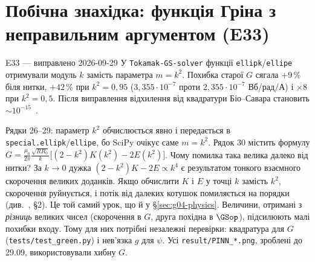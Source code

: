 \section{Побічна знахідка: функція Гріна з неправильним аргументом (E33)}\label{sec:g04-e33}

\begin{established}{E33 --- виправлено 2026-09-29}
У \texttt{Tokamak-GS-solver} функції \texttt{ellipk}/\texttt{ellipe} отримували модуль $k$ замість параметра $m=k^2$. Похибка старої $G$ сягала $+9\,\%$ біля нитки, $+42\,\%$ при $k^2=0{,}95$ ($3{,}355\cdot10^{-7}$ проти $2{,}355\cdot10^{-7}$ Вб/рад/А) і $\times8$ при $k^2=0{,}5$. Після виправлення відхилення від квадратури Біо--Савара становить $\sim10^{-15}$~\cite{RegEst,g04GSsolverChanges}.
\end{established}


Рядки 26--29: параметр $k^2$ обчислюється явно і передається в \texttt{special.ellipk}/\texttt{ellipe}, бо SciPy очікує саме $m=k^2$. Рядок 30 містить формулу $G=\frac{\mu_0}{2\pi}\frac{\sqrt{RR_0}}{k}\big[(2-k^2)K(k^2)-2E(k^2)\big]$. Чому помилка така велика далеко від нитки? За $k\to0$ дужка $(2-k^2)K-2E\propto k^4$ є результатом тонкого взаємного скорочення великих доданків. Якщо обчислити $K$ і $E$ у точці $k$ замість $k^2$, скорочення руйнується, і потік від далеких котушок помиляється на порядки (див.~\cite{g04GSsolverChanges}, §2). Це той самий урок, що й у \S\ref{sec:g04-physics}. Величини, отримані з \emph{різниць} великих чисел (скорочення в $G$, друга похідна в $\GSop$), підсилюють малі похибки входу. Тому для них потрібні незалежні перевірки: квадратура для $G$ (\texttt{tests/test\_green.py}) і нев'язка $g$ для $\psi$. Усі \texttt{result/PINN\_*.png}, зроблені до 29.09, використовували хибну $G$.

